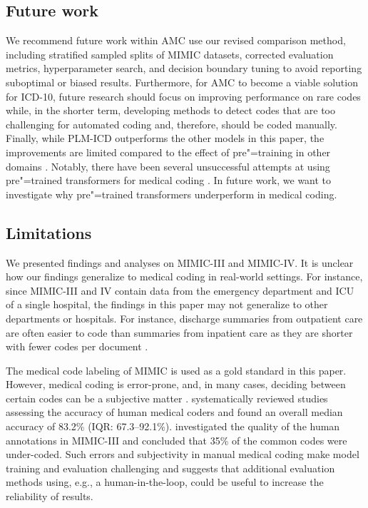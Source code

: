 {\subsection{Future work}
We recommend future work within AMC use our revised comparison method, including stratified sampled splits of MIMIC datasets, corrected evaluation metrics, hyperparameter search, and decision boundary tuning to avoid reporting suboptimal or biased results. 
Furthermore, for AMC to become a viable solution for ICD-10, future research should focus on improving performance on rare codes while, in the shorter term, developing methods to detect codes that are too challenging for automated coding and, therefore, should be coded manually. Finally, while PLM-ICD outperforms the other models in this paper, the improvements are limited compared to the effect of pre"=training in other domains \parencite{mohamed_selfsupervised_2022, linPretrainedTransformersText2021,baevski_wav2vec_2020,devlin_bert_2018,dosovitskiy_image_2021}.
Notably, there have been several unsuccessful attempts at using pre"=trained transformers for medical coding \parencite{jiDoesMagicBERT2021,gaoLimitationsTransformersClinical2021,michalopoulosICDBigBirdContextualEmbedding2022,pascualBERTbasedAutomaticICD2021,zhangBERTXMLLargeScale2020}. In future work, we want to investigate why pre"=trained transformers underperform in medical coding.


\subsection{Limitations}
We presented findings and analyses on MIMIC-III and MIMIC-IV. It is unclear how our findings generalize to medical coding in real-world settings.
For instance, since MIMIC-III and IV contain data from the emergency department and ICU of a single hospital, the findings in this paper may not generalize to other departments or hospitals. 
For instance, discharge summaries from outpatient care are often easier to code than summaries from inpatient care as they are shorter with fewer codes per document \parencite{zhangBERTXMLLargeScale2020, liuEffectiveConvolutionalAttention2021, tsengAdministrativeCostsAssociated2018}.

The medical code labeling of MIMIC is used as a gold standard in this paper. However, medical coding is error-prone, and, in many cases, deciding between certain codes can be a subjective matter \parencite{nouraeiAuditNatureImpact2013, lloydPhysicianCodingErrors1985}. \textcite{burnsSystematicReviewDischarge2012} systematically reviewed studies assessing the accuracy of human medical coders and found an overall median accuracy of 83.2\% (IQR: 67.3–92.1\%). \textcite{searleExperimentalEvaluationDevelopment2020} investigated the quality of the human annotations in MIMIC-III and concluded that 35\% of the common codes were under-coded. Such errors and subjectivity in manual medical coding make model training and evaluation challenging and suggests that additional evaluation methods using, e.g., a human-in-the-loop, could be useful to increase the reliability of results. 

}
